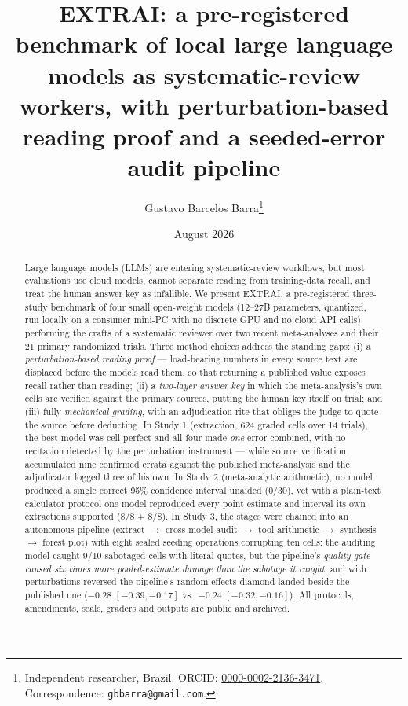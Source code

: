\documentclass[11pt]{article}
\title{\textbf{EXTRAI: a pre-registered benchmark of local large language models as systematic-review workers, with perturbation-based reading proof and a seeded-error audit pipeline}}
\author{Gustavo Barcelos Barra\thanks{Independent researcher, Brazil. ORCID: \href{https://orcid.org/0000-0002-2136-3471}{0000-0002-2136-3471}. Correspondence: \texttt{gbbarra@gmail.com}.}}
\date{August 2026}
\begin{document}
\maketitle

\begin{abstract}
\noindent Large language models (LLMs) are entering systematic-review workflows, but most evaluations use cloud models, cannot separate reading from training-data recall, and treat the human answer key as infallible. We present EXTRAI, a pre-registered three-study benchmark of four small open-weight models (12--27B parameters, quantized, run locally on a consumer mini-PC with no discrete GPU and no cloud API calls) performing the crafts of a systematic reviewer over two recent meta-analyses and their 21 primary randomized trials. Three method choices address the standing gaps: (i) a \emph{perturbation-based reading proof} --- load-bearing numbers in every source text are displaced before the models read them, so that returning a published value exposes recall rather than reading; (ii) a \emph{two-layer answer key} in which the meta-analysis's own cells are verified against the primary sources, putting the human key itself on trial; and (iii) fully \emph{mechanical grading}, with an adjudication rite that obliges the judge to quote the source before deducting. In Study 1 (extraction, 624 graded cells over 14 trials), the best model was cell-perfect and all four made \emph{one} error combined, with no recitation detected by the perturbation instrument --- while source verification accumulated nine confirmed errata against the published meta-analysis and the adjudicator logged three of his own. In Study 2 (meta-analytic arithmetic), no model produced a single correct 95\% confidence interval unaided (0/30), yet with a plain-text calculator protocol one model reproduced every point estimate and interval its own extractions supported (8/8 + 8/8). In Study 3, the stages were chained into an autonomous pipeline (extract $\rightarrow$ cross-model audit $\rightarrow$ tool arithmetic $\rightarrow$ synthesis $\rightarrow$ forest plot) with eight sealed seeding operations corrupting ten cells: the auditing model caught 9/10 sabotaged cells with literal quotes, but the pipeline's \emph{quality gate caused six times more pooled-estimate damage than the sabotage it caught}, and with perturbations reversed the pipeline's random-effects diamond landed beside the published one ($-0.28$ $[-0.39, -0.17]$ vs.\ $-0.24$ $[-0.32, -0.16]$). All protocols, amendments, seals, graders and outputs are public and archived.
\end{abstract}
\end{document}

